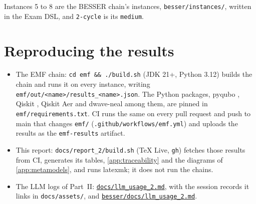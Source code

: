 \documentclass{article}
\begin{document}

Instances 5 to 8 are the BESSER chain's instances, \texttt{besser/instances/}, written in the Exam DSL, and
\texttt{2-cycle} is its \texttt{medium}.


\section{Reproducing the results}\label{app:reproduce}

\begin{itemize}
	\item The EMF chain: \texttt{cd emf \&\& ./build.sh} (JDK 21+, Python 3.12) builds the chain and runs it
	      on every instance, writing \texttt{emf/out/<name>/results\_<name>.json}. The Python packages,
	      pyqubo \cite{pyqubo}, Qiskit \cite{Qiskit}, Qiskit Aer and dwave-neal among them, are pinned in
	      \texttt{emf/requirements.txt}. CI runs the same on every pull request and push to main that changes \texttt{emf/}
	      (\texttt{.github/workflows/emf.yml})
	      and uploads the results as the \texttt{emf-results} artifact.
	\item This report: \texttt{docs/report\_2/build.sh} (TeX Live, \texttt{gh}) fetches those results from
	      CI, generates its tables, \cref{app:traceability} and the diagrams of \cref{app:metamodels}, and
	      runs latexmk; it does not run the chains.
	\item The LLM logs of Part~II:
	      \href{https://github.com/Alef-Keuffer/qmde/blob/main/docs/llm_usage_2.md}{\texttt{docs/llm\_usage\_2.md}},
	      with the session records it links in \texttt{docs/assets/}, and
	      \href{https://github.com/Alef-Keuffer/qmde/blob/main/besser/docs/llm_usage_2.md}{\texttt{besser/docs/llm\_usage\_2.md}}.
\end{itemize}

\end{document}
